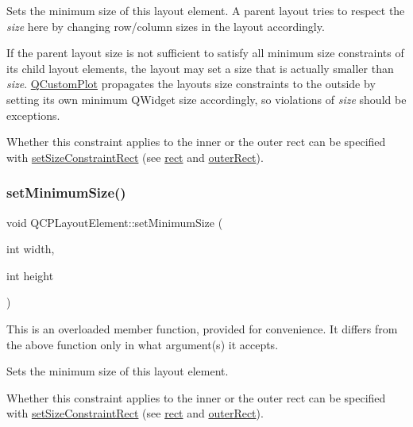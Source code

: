 Sets the minimum size of this layout element. A parent layout tries to respect the {\itshape size} here by changing row/column sizes in the layout accordingly.

If the parent layout size is not sufficient to satisfy all minimum size constraints of its child layout elements, the layout may set a size that is actually smaller than {\itshape size}. \mbox{\hyperlink{class_q_custom_plot}{Q\+Custom\+Plot}} propagates the layout\textquotesingle{}s size constraints to the outside by setting its own minimum Q\+Widget size accordingly, so violations of {\itshape size} should be exceptions.

Whether this constraint applies to the inner or the outer rect can be specified with \mbox{\hyperlink{class_q_c_p_layout_element_a361666cdcc6fbfd37344cc44be746b0f}{set\+Size\+Constraint\+Rect}} (see \mbox{\hyperlink{class_q_c_p_layout_element_a208effccfe2cca4a0eaf9393e60f2dd4}{rect}} and \mbox{\hyperlink{class_q_c_p_layout_element_a2a32a12a6161c9dffbadeb9cc585510c}{outer\+Rect}}). \mbox{\label{class_q_c_p_layout_element_a8e0447614a0bf92de9a7304588c6b96e}} 
\subsubsection{\texorpdfstring{setMinimumSize()}{setMinimumSize()}\hspace{0.1cm}{\footnotesize\ttfamily [2/2]}}
{\footnotesize\ttfamily void Q\+C\+P\+Layout\+Element\+::set\+Minimum\+Size (\begin{DoxyParamCaption}\item[{int}]{width,  }\item[{int}]{height }\end{DoxyParamCaption})}

This is an overloaded member function, provided for convenience. It differs from the above function only in what argument(s) it accepts.

Sets the minimum size of this layout element.

Whether this constraint applies to the inner or the outer rect can be specified with \mbox{\hyperlink{class_q_c_p_layout_element_a361666cdcc6fbfd37344cc44be746b0f}{set\+Size\+Constraint\+Rect}} (see \mbox{\hyperlink{class_q_c_p_layout_element_a208effccfe2cca4a0eaf9393e60f2dd4}{rect}} and \mbox{\hyperlink{class_q_c_p_layout_element_a2a32a12a6161c9dffbadeb9cc585510c}{outer\+Rect}}). \mbox{\label{class_q_c_p_layout_element_a38975ea13e36de8e53391ce41d94bc0f}} 
